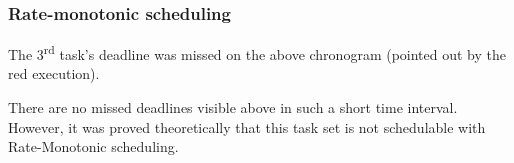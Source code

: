\subsubsection{Rate-monotonic scheduling}

\begin{RTGrid}[width=10cm]{3}{20}







\end{RTGrid}

The 3\textsuperscript{rd} task's deadline was missed on the above chronogram (pointed out by the red execution). \\

\begin{RTGrid}[width=10cm]{3}{22}







\end{RTGrid}

There are no missed deadlines visible above in such a short time interval. However, it was proved theoretically that this task set is not schedulable with Rate-Monotonic scheduling.

